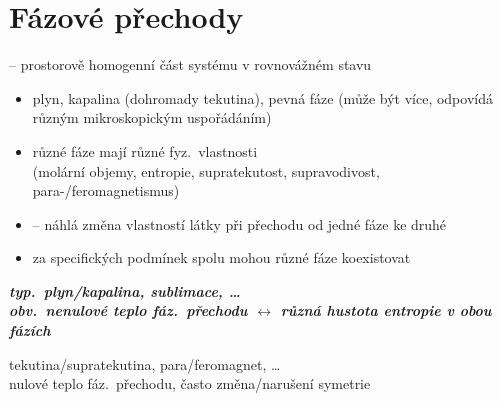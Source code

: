 \section{Fázové přechody}

\begin{definice}[Fáze]
 -- prostorově homogenní část systému v rovnovážném stavu
\begin{itemize}[nosep]
  \item[--] plyn, kapalina (dohromady tekutina), pevná fáze (může být více, odpovídá různým mikroskopickým uspořádáním)
  \item[--] různé fáze mají různé fyz.\ vlastnosti \\
        (molární objemy, entropie, supratekutost, supravodivost, para-/feromagnetismus)
\end{itemize}
\end{definice}

\begin{itemize}
  \item {} -- náhlá změna vlastností látky při přechodu od jedné fáze ke druhé
  \item za specifických podmínek spolu mohou různé fáze koexistovat
\end{itemize}

{\color{NavyBlue}\bfseries\itshape
{} typ.\ plyn/kapalina, sublimace, \dots \\
\hspace*{1.5em} obv.\ nenulové teplo fáz.\ přechodu \quad $\leftrightarrow$ různá hustota entropie v obou fázích

 tekutina/supratekutina, para/feromagnet, \dots \\
\hspace*{1.5em} nulové teplo fáz.\ přechodu, často změna/narušení symetrie}

